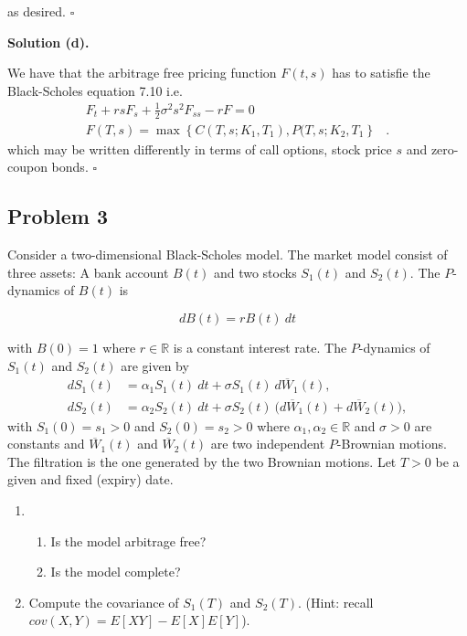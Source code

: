 \documentclass[a4paper,12pt,openany]{book}
\providecommand{\tightlist}{%
 \setlength{\itemsep}{0pt}\setlength{\parskip}{0pt}}
\begin{document}
as desired. \(\square\)

\noindent\makebox[\linewidth]{\rule{\textwidth}{0.4pt}}

\textbf{Solution (d).}

We have that the arbitrage free pricing function \(F(t,s)\) has to satisfie the Black-Scholes equation 7.10 i.e.
\begin{align*}
F_t+rsF_s+\frac{1}{2}\sigma ^2 s^2F_{ss}-rF=0&\\
F(T,s)=\max\left\{C(T,s;K_1,T_1),P(T,s;K_2,T_1\right\}&.
\end{align*}
which may be written differently in terms of call options, stock price \(s\) and zero-coupon bonds. \(\square\)

\noindent\makebox[\linewidth]{\rule{\textwidth}{0.4pt}}

\hypertarget{problem-3-1}{%
\subsection{Problem 3}\label{problem-3-1}}

Consider a two-dimensional Black-Scholes model. The market model consist of three assets: A bank account \(B(t)\) and two stocks \(S_1(t)\) and \(S_2(t)\). The \(P\)-dynamics of \(B(t)\) is

\[
dB(t)=rB(t)\ dt
\]

with \(B(0)=1\) where \(r\in\mathbb{R}\) is a constant interest rate. The \(P\)-dynamics of \(S_1(t)\) and \(S_2(t)\) are given by
\begin{align*}
dS_1(t)&=\alpha_1S_1(t)\ dt+\sigma S_1(t)\ d\overline{W}_1(t),\\
dS_2(t)&=\alpha_2S_2(t)\ dt+\sigma S_2(t)\ \big(d\overline{W}_1(t)+d\overline{W}_2(t)\big),
\end{align*}
with \(S_1(0)=s_1>0\) and \(S_2(0)=s_2>0\) where \(\alpha_1,\alpha_2\in\mathbb{R}\) and \(\sigma>0\) are constants and \(\overline{W}_1(t)\) and \(\overline{W}_2(t)\) are two independent \(P\)-Brownian motions. The filtration is the one generated by the two Brownian motions. Let \(T>0\) be a given and fixed (expiry) date.

\begin{enumerate}
\def\labelenumi{\alph{enumi}.}
\item
  \begin{enumerate}
  \def\labelenumii{\roman{enumii}.}
  \tightlist
  \item
    Is the model arbitrage free?
  \item
    Is the model complete?
  \end{enumerate}
\item
  Compute the covariance of \(S_1(T)\) and \(S_2(T)\). (Hint: recall \(cov(X,Y)=E[XY]-E[X]E[Y]\)).
\end{enumerate}
\end{document}
